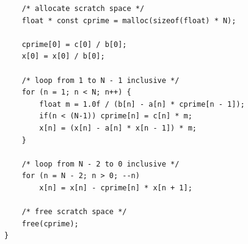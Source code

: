 \documentclass[12pt]{iopart}
\begin{document}
\begin{itemize}
\begin{lstlisting}
    /* allocate scratch space */
    float * const cprime = malloc(sizeof(float) * N);
     
    cprime[0] = c[0] / b[0];
    x[0] = x[0] / b[0];
    
    /* loop from 1 to N - 1 inclusive */
    for (n = 1; n < N; n++) {
        float m = 1.0f / (b[n] - a[n] * cprime[n - 1]);
        if(n < (N-1)) cprime[n] = c[n] * m;
        x[n] = (x[n] - a[n] * x[n - 1]) * m;
    }
    
    /* loop from N - 2 to 0 inclusive */
    for (n = N - 2; n > 0; --n)
        x[n] = x[n] - cprime[n] * x[n + 1];
      
    /* free scratch space */
    free(cprime);
}
\end{lstlisting}
\end{itemize}

\end{document}
